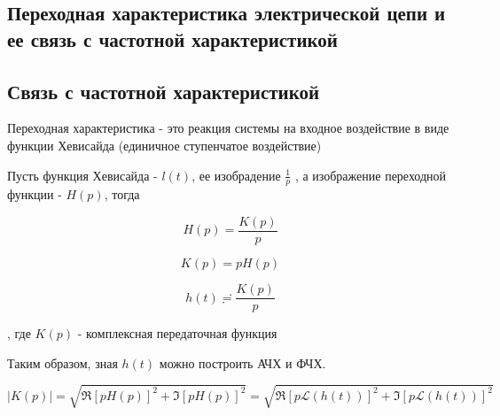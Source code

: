 \subsection{Переходная характеристика электрической цепи и ее связь с частотной характеристикой}
\subsection{Связь с частотной характеристикой}


Переходная характеристика - это реакция системы на входное воздействие в виде функции Хевисайда (единичное ступенчатое воздействие)

Пусть функция Хевисайда - $l(t)$, ее изобрадение $ \frac{1}{p}$ , а изображение переходной функции - $H(p)$, тогда

\begin{equation}
H(p) = \frac{K(p)}{p}
\end{equation} 

\begin{equation}
K(p) = p H(p)
\end{equation}


\begin{equation}
h(t) \risingdotseq  \frac{K(p)}{p}
\end{equation}

, где $K(p)$ - комплексная передаточная функция

Таким образом, зная $h(t)$ можно построить АЧХ и ФЧХ.

\begin{equation}
|K(p)| = \sqrt{ \Re[p H(p)]^2 + \Im[p H(p)]^2 } =\sqrt{ \Re[ p \mathcal{L}(h(t))]^2 + \Im[ p \mathcal{L}(h(t))]^2 } 
\end{equation}


\pagebreak
